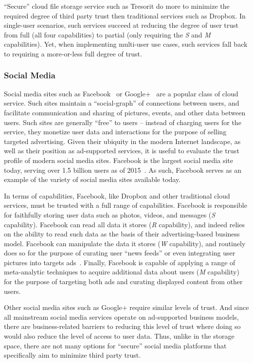 ``Secure'' cloud file storage service such as Tresorit do more to
minimize the required degree of third party trust then traditional
services such as Dropbox. In single-user scenarios, such services
succeed at reducing the degree of user trust from full (all four
capabilities) to partial (only requiring the \emph{S} and \emph{M}
capabilities). Yet, when implementing multi-user use cases, such
services fall back to requiring a more-or-less full degree of trust.

\subsubsection{Social Media}

Social media sites such as Facebook~\cite{facebook} or
Google+~\cite{google-plus} are a popular class of cloud service. Such
sites maintain a ``social-graph'' of connections between users, and
facilitate communication and sharing of pictures, events, and other
data between users. Such sites are generally ``free'' to users --
instead of charging users for the service, they monetize user data and
interactions for the purpose of selling targeted advertising. Given
their ubiquity in the modern Internet landscape, as well as their
position as ad-supported services, it is useful to evaluate the trust
profile of modern social media sites. Facebook is the largest social
media site today, serving over 1.5 billion users as of
2015~\cite{foster2014}. As such, Facebook serves as an example of the
variety of social media sites available today.

In terms of capabilities, Facebook, like Dropbox and other traditional
cloud services, must be trusted with a full range of capabilities.
Facebook is responsible for faithfully storing user data such as
photos, videos, and messages (\emph{S} capability). Facebook can read
all data it stores (\emph{R} capability), and indeed relies on the
ability to read such data as the basis of their advertising-based
business model. Facebook can manipulate the data it stores (\emph{W}
capability), and routinely does so for the purpose of curating user
``news feeds'' or even integrating user pictures into targets
ads~\cite{mashable-socialads}. Finally, Facebook is capable of
applying a range of meta-analytic techniques to acquire additional
data about users (\emph{M} capability) for the purpose of targeting
both ads and curating displayed content from other users.

Other social media sites such as Google+ require similar levels of
trust. And since all mainstream social media services operate on
ad-supported business models, there are business-related barriers to
reducing this level of trust where doing so would also reduce the
level of access to user data. Thus, unlike in the storage space, there
are not many options for ``secure'' social media platforms that
specifically aim to minimize third party trust.

